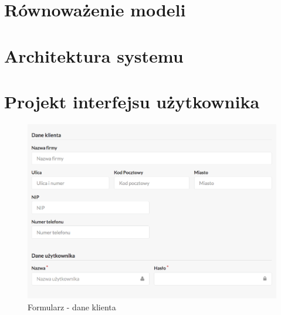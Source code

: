 \documentclass[paper=a4, fontsize=12pt]{scrartcl}
\numberwithin{equation}{section}		%
\numberwithin{figure}{section}			%
\numberwithin{table}{section}				%
\begin{document}
\section{Równoważenie modeli}
	

\section{Architektura systemu}
	

\section{Projekt interfejsu użytkownika}

	\begin{figure}[H]
		\centering
		\centerline{\includegraphics[width=\textwidth]{partials/2-wymagania/dokumenty/dane-klienta.png}}
		\caption{Formularz - dane klienta}
	\end{figure}
\end{document}
